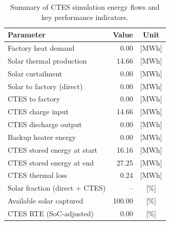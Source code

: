 \renewcommand{\arraystretch}{1.2}
\begin{table}[h]
\centering
\begin{tabular}{l|r c}
\hline
Parameter & Value & Unit \\
\hline
Factory heat demand & 0.00 & [MWh] \\
Solar thermal production & 14.66 & [MWh] \\
Solar curtailment & 0.00 & [MWh] \\
Solar to factory (direct) & 0.00 & [MWh] \\
CTES to factory & 0.00 & [MWh] \\
CTES charge input & 14.66 & [MWh] \\
CTES discharge output & 0.00 & [MWh] \\
Backup heater energy & 0.00 & [MWh] \\
CTES stored energy at start & 16.16 & [MWh] \\
CTES stored energy at end & 27.25 & [MWh] \\
CTES thermal loss & 0.24 & [MWh] \\
\hline
Solar fraction (direct + CTES) & -- & [\%] \\
Available solar captured & 100.00 & [\%] \\
CTES RTE (SoC-adjusted) & 0.00 & [\%] \\
\hline
\end{tabular}
\caption{Summary of CTES simulation energy flows and key performance indicators.}
\label{tab:ctes-simulation-summary}
\end{table}
